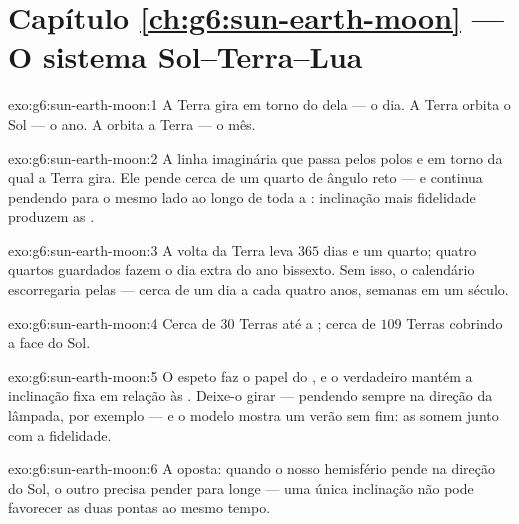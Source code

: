 \section*{Capítulo \ref{ch:g6:sun-earth-moon} --- O sistema Sol--Terra--Lua}

\begin{solution}{exo:g6:sun-earth-moon:1}
A Terra gira em torno do  dela --- o dia. A Terra orbita o Sol
--- o ano. A  orbita a Terra --- o mês.
\end{solution}

\begin{solution}{exo:g6:sun-earth-moon:2}
A linha imaginária que passa pelos polos e em torno da qual a Terra
gira. Ele pende cerca de um quarto de ângulo reto --- e continua
pendendo para o mesmo lado ao longo de toda a : inclinação mais
fidelidade produzem as .
\end{solution}

\begin{solution}{exo:g6:sun-earth-moon:3}
A volta da Terra leva $365$ dias e um quarto; quatro quartos
guardados fazem o dia extra do ano bissexto. Sem isso, o calendário
escorregaria pelas  --- cerca de um dia a cada quatro anos,
semanas em um século.
\end{solution}

\begin{solution}{exo:g6:sun-earth-moon:4}
Cerca de $30$ Terras até a ; cerca de $109$ Terras cobrindo a face
do Sol.
\end{solution}

\begin{solution}{exo:g6:sun-earth-moon:5}
O espeto faz o papel do , e o  verdadeiro mantém a
inclinação fixa em relação às . Deixe-o girar --- pendendo
sempre na direção da lâmpada, por exemplo --- e o modelo mostra um
verão sem fim: as  somem junto com a fidelidade.
\end{solution}

\begin{solution}{exo:g6:sun-earth-moon:6}
A  oposta: quando o nosso hemisfério pende na direção do Sol,
o outro precisa pender para longe --- uma única inclinação não pode
favorecer as duas pontas ao mesmo tempo.
\end{solution}

